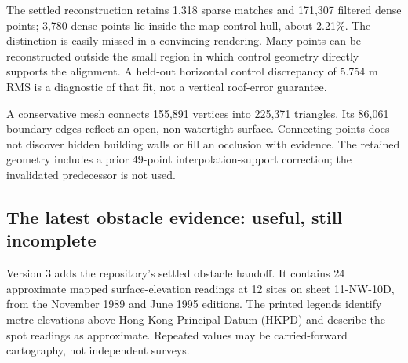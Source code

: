 
The settled reconstruction retains 1,318 sparse matches and 171,307 filtered dense points; 3,780 dense points lie inside the map-control hull, about 2.21\%. The distinction is easily missed in a convincing rendering. Many points can be reconstructed outside the small region in which control geometry directly supports the alignment. A held-out horizontal control discrepancy of 5.754 m RMS is a diagnostic of that fit, not a vertical roof-error guarantee.

A conservative mesh connects 155,891 vertices into 225,371 triangles. Its 86,061 boundary edges reflect an open, non-watertight surface. Connecting points does not discover hidden building walls or fill an occlusion with evidence. The retained geometry includes a prior 49-point interpolation-support correction; the invalidated predecessor is not used.

\clearpage
\subsection*{The latest obstacle evidence: useful, still incomplete}
Version 3 adds the repository's settled obstacle handoff. It contains 24 approximate mapped surface-elevation readings at 12 sites on sheet 11-NW-10D, from the November 1989 and June 1995 editions. The printed legends identify metre elevations above Hong Kong Principal Datum (HKPD) and describe the spot readings as approximate. Repeated values may be carried-forward cartography, not independent surveys.

